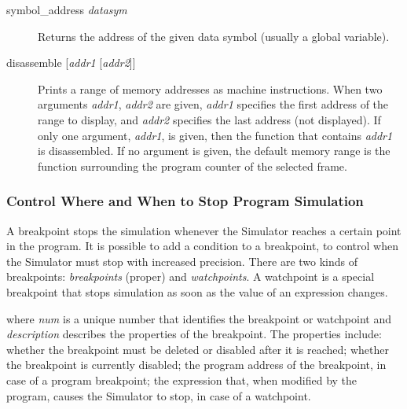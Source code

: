 \documentclass[twoside]{tceusermanual}
\begin{document}
\begin{description}
\item[symbol\_address \emph{datasym} ] %

  Returns the address of the given data symbol (usually
  a global variable). 

\item[disassemble {[\emph{addr1} [\emph{addr2}]]}] %
  Prints a range of memory addresses as machine instructions.  When two
  arguments \emph{addr1}, \emph{addr2} are given, \emph{addr1} specifies the
  first address of the range to display, and \emph{addr2} specifies the last
  address (not displayed).  If only one argument, \emph{addr1}, is given,
  then the function that contains \emph{addr1} is disassembled.  If no
  argument is given, the default memory range is the function surrounding
  the program counter of the selected frame.

\end{description}

\subsubsection{Control Where and When to Stop Program Simulation}
\label{ssec:debug-breakpoints}

A breakpoint stops the simulation whenever the Simulator reaches a certain
point in the program. It is possible to add a condition to a breakpoint, to
control when the Simulator must stop with increased precision. There are two
kinds of breakpoints: \emph{breakpoints} (proper) and \emph{watchpoints}. A
watchpoint is a special breakpoint that stops simulation as soon as the
value of an expression changes.

%
where \emph{num} is a unique number that identifies the breakpoint or
watchpoint and \emph{description} describes the properties of the
breakpoint. The properties include: whether the breakpoint must be deleted
or disabled after it is reached; whether the breakpoint is currently
disabled; the program address of the breakpoint, in case of a program
breakpoint; the expression that, when modified by the program, causes the
Simulator to stop, in case of a watchpoint.
\end{document}
